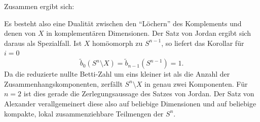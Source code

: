 Zusammen ergibt sich:



Es besteht also eine Dualität zwischen den ``Löchern'' des Komplements und denen von $X$ in komplementären Dimensionen.
Der Satz von Jordan ergibt sich daraus als Spezialfall.
Ist $X$ homöomorph zu $S^{n-1}$, so liefert das Korollar für $i = 0$
\[
    \tilde{b}_0(S^n \setminus X) = \tilde{b}_{n-1}(S^{n-1}) = 1.
\]
Da die reduzierte nullte Betti-Zahl um eins kleiner ist als die Anzahl der Zusammenhangskomponenten, zerfällt $S^n \setminus X$ in genau zwei Komponenten.
Für $n = 2$ ist dies gerade die Zerlegungsaussage des Satzes von Jordan.
Der Satz von Alexander verallgemeinert diese also auf beliebige Dimensionen und auf beliebige kompakte, lokal zusammenziehbare Teilmengen der $S^n$.

